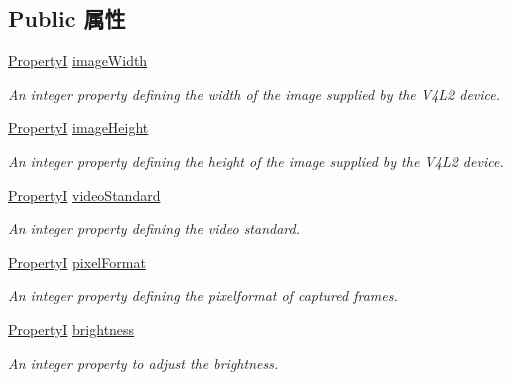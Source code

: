 \subsection*{Public 属性}
\begin{DoxyCompactItemize}
\item 
\hyperlink{group___common_interface_ga12d5e434238ca242a1ba4c6c3ea45780}{Property\+I} \hyperlink{classmv_i_m_p_a_c_t_1_1acquire_1_1_camera_settings_v4_l2_device_a27fa220018e3020479e1f376e6f8d881}{image\+Width}
\begin{DoxyCompactList}\small\item\em An integer property defining the width of the image supplied by the V4\+L2 device. \end{DoxyCompactList}\item 
\hyperlink{group___common_interface_ga12d5e434238ca242a1ba4c6c3ea45780}{Property\+I} \hyperlink{classmv_i_m_p_a_c_t_1_1acquire_1_1_camera_settings_v4_l2_device_a863f0a0d412f2934371d20fe4008f025}{image\+Height}
\begin{DoxyCompactList}\small\item\em An integer property defining the height of the image supplied by the V4\+L2 device. \end{DoxyCompactList}\item 
\hyperlink{group___common_interface_ga12d5e434238ca242a1ba4c6c3ea45780}{Property\+I} \hyperlink{classmv_i_m_p_a_c_t_1_1acquire_1_1_camera_settings_v4_l2_device_aeb57b67f5eac2c20462ce1d2cc33e3b3}{video\+Standard}
\begin{DoxyCompactList}\small\item\em An integer property defining the video standard. \end{DoxyCompactList}\item 
\hyperlink{group___common_interface_ga12d5e434238ca242a1ba4c6c3ea45780}{Property\+I} \hyperlink{classmv_i_m_p_a_c_t_1_1acquire_1_1_camera_settings_v4_l2_device_a86735fd2b340192e2a69242d0cfb7b2f}{pixel\+Format}
\begin{DoxyCompactList}\small\item\em An integer property defining the pixelformat of captured frames. \end{DoxyCompactList}\item 
\hyperlink{group___common_interface_ga12d5e434238ca242a1ba4c6c3ea45780}{Property\+I} \hyperlink{classmv_i_m_p_a_c_t_1_1acquire_1_1_camera_settings_v4_l2_device_a6d51dc2a6441671cc8c5c4ba0cded763}{brightness}
\begin{DoxyCompactList}\small\item\em An integer property to adjust the brightness. \end{DoxyCompactList}\item 

\end{DoxyCompactItemize}
